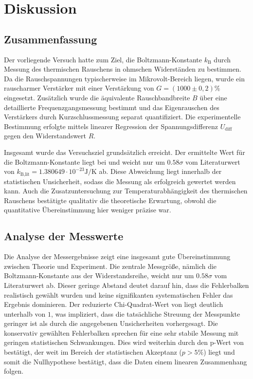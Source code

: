 \chapter{Diskussion}
\label{ch:Diskussion}

\section{Zusammenfassung}
\label{sec:Zusammenfassung}

Der vorliegende Versuch hatte zum Ziel, die Boltzmann-Konstante $k_\text{B}$ durch Messung des thermischen Rauschens in ohmschen Widerständen zu bestimmen. Da die Rauschspannungen typischerweise im Mikrovolt-Bereich liegen, wurde ein rauscharmer Verstärker mit einer Verstärkung von $G = (1000 \pm 0,2)\%$ eingesetzt. Zusätzlich wurde die äquivalente Rauschbandbreite $B$ über eine detaillierte Frequenzgangsmessung bestimmt und das Eigenrauschen des Verstärkers durch Kurzschlussmessung separat quantifiziert. Die experimentelle Bestimmung erfolgte mittels linearer Regression der Spannungsdifferenz $U_\text{diff}$ gegen den Widerstandswert $R$.

Insgesamt wurde das Versuchsziel grundsätzlich erreicht. Der ermittelte Wert für die Boltzmann-Konstante liegt bei
und weicht nur um $0.58\sigma$ vom Literaturwert von $k_\text{B,lit}= 1.380649 \cdot 10^{-23}\mathrm{J/K}$ ab. Diese Abweichung liegt innerhalb der statistischen Unsicherheit, sodass die Messung als erfolgreich gewertet werden kann. Auch die Zusatzuntersuchung zur Temperaturabhängigkeit des thermischen Rauschens bestätigte qualitativ die theoretische Erwartung, obwohl die quantitative Übereinstimmung hier weniger präzise war.

\section{Analyse der Messwerte}
\label{sec:Analyse}

Die Analyse der Messergebnisse zeigt eine insgesamt gute Übereinstimmung zwischen Theorie und Experiment. Die zentrale Messgröße, nämlich die Boltzmann-Konstante aus der Widerstandsreihe, weicht nur um $0.58\sigma$ vom Literaturwert ab. Dieser geringe Abstand deutet darauf hin, dass die Fehlerbalken realistisch gewählt wurden und keine signifikanten systematischen Fehler das Ergebnis dominieren. Der reduzierte Chi-Quadrat-Wert von
liegt deutlich unterhalb von $1$, was impliziert, dass die tatsächliche Streuung der Messpunkte geringer ist als durch die angegebenen Unsicherheiten vorhergesagt. Die konservativ gewählten Fehlerbalken sprechen für eine sehr stabile Messung mit geringen statistischen Schwankungen. Dies wird weiterhin durch den p-Wert von
bestätigt, der weit im Bereich der statistischen Akzeptanz ($p > 5\%$) liegt und somit die Nullhypothese bestätigt, dass die Daten einem linearen Zusammenhang folgen.

